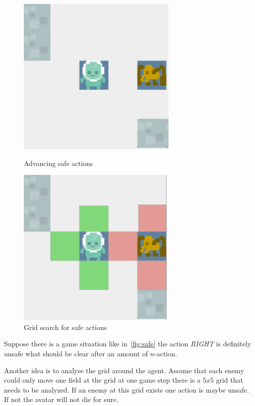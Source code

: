 \begin{figure}
\centering
\begin{minipage}{.5\textwidth}
  \centering
\includegraphics[scale=0.8]{images/safe.pdf}
\caption{Advancing safe actions}
\label{fig:safe}
\end{minipage}%
\begin{minipage}{.5\textwidth}
\centering
\includegraphics[scale=0.8]{images/safe_grid.pdf}
\caption{Grid search for safe actions}
\label{fig:safe_grid}
\end{minipage}
\end{figure}



Suppose there is a game situation like in~\cref{fig:safe} the action \textit{RIGHT} is definitely unsafe what 
should be clear after an amount of $n$-action.

Another idea is to analyse the grid around the agent. Assume that each enemy could only move one field at the grid
at one game step there is a $5x5$ grid that needs to be analyzed. If an enemy at this grid exists one action is
maybe unsafe. If not the avatar will not die for sure.


